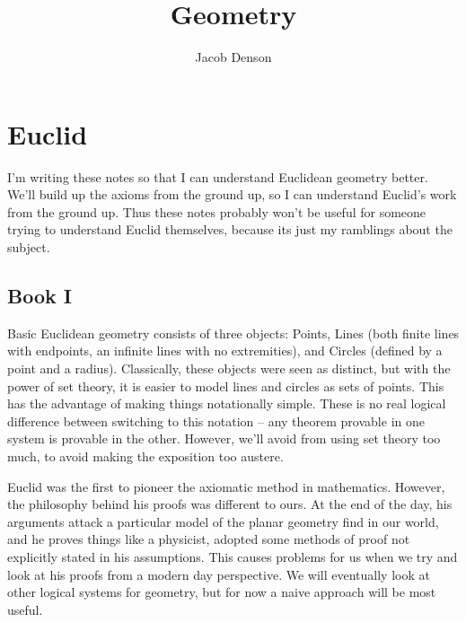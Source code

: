 

\title{Geometry}
\author{Jacob Denson}



\maketitle
\tableofcontents
{}

\part{Euclid}

I'm writing these notes so that I can understand Euclidean geometry better. We'll build up the axioms from the ground up, so I can understand Euclid's work from the ground up. Thus these notes probably won't be useful for someone trying to understand Euclid themselves, because its just my ramblings about the subject.

\chapter{Book I}

Basic Euclidean geometry consists of three objects: Points, Lines (both finite lines with endpoints, an infinite lines with no extremities), and Circles (defined by a point and a radius). Classically, these objects were seen as distinct, but with the power of set theory, it is easier to model lines and circles as sets of points. This has the advantage of making things notationally simple. These is no real logical difference between switching to this notation -- any theorem provable in one system is provable in the other. However, we'll avoid from using set theory too much, to avoid making the exposition too austere.

Euclid was the first to pioneer the axiomatic method in mathematics. However, the philosophy behind his proofs was different to ours. At the end of the day, his arguments attack a particular model of the planar geometry find in our world, and he proves things like a physicist, adopted some methods of proof not explicitly stated in his assumptions. This causes problems for us when we try and look at his proofs from a modern day perspective. We will eventually look at other logical systems for geometry, but for now a naive approach will be most useful.

